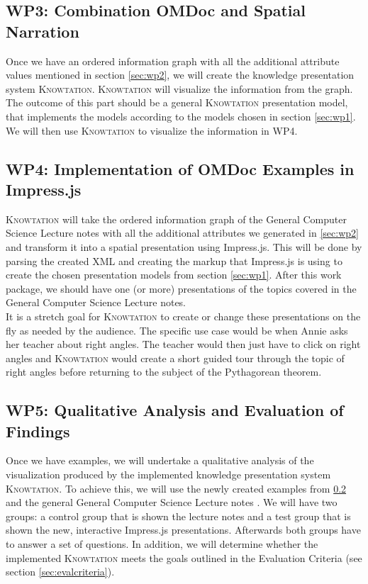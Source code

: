 \documentclass[twoside, 12pt]{article}
\newcommand{\sys}{\textsc{Knowtation}\xspace}
\begin{document}
\subsection{WP3: Combination OMDoc and Spatial Narration}
\label{sec:wp3}

Once we have an ordered information graph with all the additional attribute values mentioned in section \ref{sec:wp2}, we will create the knowledge presentation system \sys. \sys will visualize the information from the graph. The outcome of this part should be a general \sys presentation model, that implements the models according to the models chosen in section \ref{sec:wp1}. We will then use \sys to visualize the information in WP4.\\

\subsection{WP4: Implementation of OMDoc Examples in Impress.js}
\label{sec:wp4}

\sys will take the ordered information graph of the General Computer Science Lecture notes \cite{Kohlhase:GenCSI:base} with all the additional attributes we generated in \ref{sec:wp2} and transform it into a spatial presentation using Impress.js. This will be done by parsing the created XML and creating the markup that Impress.js is using to create the chosen presentation models from section \ref{sec:wp1}. After this work package, we should have one (or more) presentations of the topics covered in the General Computer Science Lecture notes.\\

It is a stretch goal for \sys to create or change these presentations on the fly as needed by the audience. The specific use case would be when Annie asks her teacher about right angles. The teacher would then just have to click on right angles and \sys would create a short guided tour through the topic of right angles before returning to the subject of the Pythagorean theorem.\\

\subsection{WP5: Qualitative Analysis and Evaluation of Findings}
\label{sec:wp5}

Once we have examples, we will undertake a qualitative analysis of the visualization produced by the implemented knowledge presentation system \sys . To achieve this, we will use the newly created examples from \ref{sec:wp4} and the general General Computer Science Lecture notes \cite{Kohlhase:GenCSI:base}. We will have two groups: a control group that is shown the lecture notes and a test group that is shown the new, interactive Impress.js presentations. Afterwards both groups have to answer a set of questions. In addition, we will determine whether the implemented \sys meets the goals outlined in the Evaluation Criteria (see section \ref{sec:evalcriteria}).\\
\end{document}
